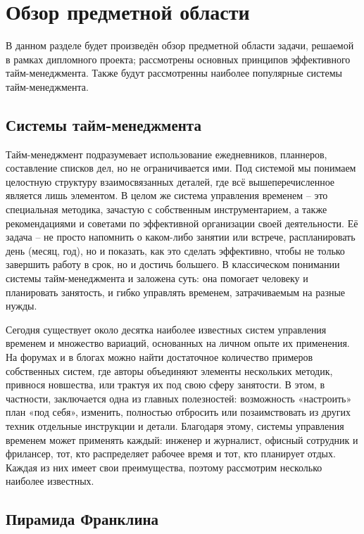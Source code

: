 \section{Обзор предметной области}
\label{sec:domain}

В данном разделе будет произведён обзор предметной области задачи, решаемой в рамках дипломного проекта; рассмотрены основных принципов эффективного тайм-менеджмента.
Также будут рассмотренны наиболее популярные системы тайм-менеджмента.

\subsection{Системы тайм-менеджмента}
\label{sub:domain:time_managament_systems}
Тайм-менеджмент подразумевает использование ежедневников, планнеров, составление списков дел, но не ограничивается ими. Под системой мы понимаем целостную структуру взаимосвязанных деталей, где всё вышеперечисленное является лишь элементом. В целом же система управления временем – это специальная методика, зачастую с собственным инструментарием, а также рекомендациями и советами по эффективной организации своей деятельности. Её задача – не просто напомнить о каком-либо занятии или встрече, распланировать день (месяц, год), но и показать, как это сделать эффективно, чтобы не только завершить работу в срок, но и достичь большего. В классическом понимании системы тайм-менеджмента и заложена суть: она помогает человеку и планировать занятость, и гибко управлять временем, затрачиваемым на разные нужды.

Сегодня существует около десятка наиболее известных систем управления временем и множество вариаций, основанных на личном опыте их применения. На форумах и в блогах можно найти достаточное количество примеров собственных систем, где авторы объединяют элементы нескольких методик, привнося новшества, или трактуя их под свою сферу занятости. В этом, в частности, заключается одна из главных полезностей: возможность «настроить» план «под себя», изменить, полностью отбросить или позаимствовать из других техник отдельные инструкции и детали. Благодаря этому, системы управления временем может применять каждый: инженер и журналист, офисный сотрудник и фрилансер, тот, кто распределяет рабочее время и тот, кто планирует отдых. Каждая из них имеет свои преимущества, поэтому рассмотрим несколько наиболее известных.


\subsection{Пирамида Франклина}

